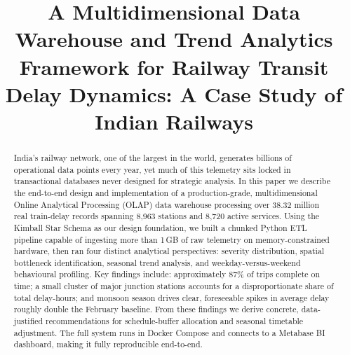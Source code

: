 \documentclass[conference]{IEEEtran}
\begin{document}
\title{A Multidimensional Data Warehouse and Trend Analytics Framework
for Railway Transit Delay Dynamics: A Case Study of Indian Railways}

\author{
  \and
}

\maketitle

\begin{abstract}
India's railway network, one of the largest in the world, generates
billions of operational data points every year, yet much of this
telemetry sits locked in transactional databases never designed for
strategic analysis.
In this paper we describe the end-to-end design and implementation of a
production-grade, multidimensional Online Analytical Processing (OLAP)
data warehouse processing over 38.32 million real train-delay records
spanning 8,963 stations and 8,720 active services.
Using the Kimball Star Schema as our design foundation, we built a
chunked Python ETL pipeline capable of ingesting more than 1\,GB of raw
telemetry on memory-constrained hardware, then ran four distinct
analytical perspectives: severity distribution, spatial bottleneck
identification, seasonal trend analysis, and weekday-versus-weekend
behavioural profiling.
Key findings include: approximately 87\% of trips complete on time; a
small cluster of major junction stations accounts for a disproportionate
share of total delay-hours; and monsoon season drives clear, foreseeable
spikes in average delay roughly double the February baseline.
From these findings we derive concrete, data-justified recommendations for
schedule-buffer allocation and seasonal timetable adjustment.
The full system runs in Docker Compose and connects to a Metabase BI
dashboard, making it fully reproducible end-to-end.
\end{abstract}
\end{document}

